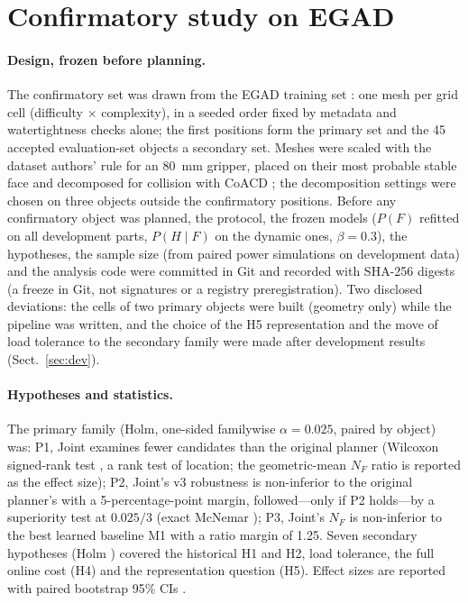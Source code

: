 \section{Confirmatory study on EGAD}\label{sec:conf}

\paragraph{Design, frozen before planning.} The confirmatory set was drawn from the EGAD training set \cite{morrison2020egad}: one mesh per grid cell (difficulty $\times$ complexity), in a seeded order fixed by metadata and watertightness checks alone; the first \confObjects{} positions form the primary set and the 45 accepted evaluation-set objects a secondary set. Meshes were scaled with the dataset authors' rule for an 80~mm gripper, placed on their most probable stable face and decomposed for collision with CoACD \cite{wei2022coacd}; the decomposition settings were chosen on three objects outside the confirmatory positions. Before any confirmatory object was planned, the protocol, the frozen models ($P(F)$ refitted on all \devAllParts{} development parts, $P(H\mid F)$ on the \devParts{} dynamic ones, $\beta=0.3$), the hypotheses, the sample size (from paired power simulations on development data) and the analysis code were committed in Git and recorded with SHA-256 digests (a freeze in Git, not signatures or a registry preregistration). Two disclosed deviations: the cells of two primary objects were built (geometry only) while the pipeline was written, and the choice of the H5 representation and the move of load tolerance to the secondary family were made after development results (Sect.~\ref{sec:dev}).

\paragraph{Hypotheses and statistics.} The primary family (Holm, one-sided familywise $\alpha=0.025$, paired by object) was: P1, Joint examines fewer candidates than the original planner (Wilcoxon signed-rank test \cite{wilcoxon1945}, a rank test of location; the geometric-mean $N_F$ ratio is reported as the effect size); P2, Joint's v3 robustness is non-inferior to the original planner's with a 5-percentage-point margin, followed---only if P2 holds---by a superiority test at $0.025/3$ (exact McNemar \cite{mcnemar1947}); P3, Joint's $N_F$ is non-inferior to the best learned baseline M1 with a ratio margin of 1.25. Seven secondary hypotheses (Holm \cite{holm1979}) covered the historical H1 and H2, load tolerance, the full online cost (H4) and the representation question (H5). Effect sizes are reported with paired bootstrap 95\% CIs \cite{efron1979bootstrap}.

